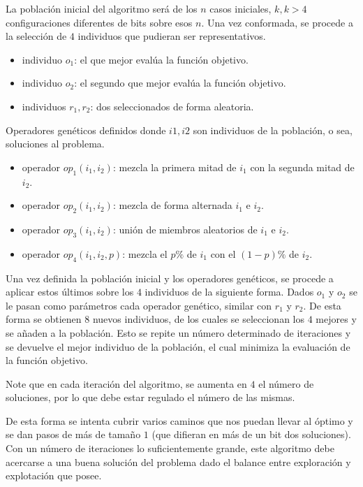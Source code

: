 \documentclass[a4paper,12pt]{book}
\begin{document}
		La población inicial del algoritmo será de los $n$ casos iniciales, $k, k > 4$ configuraciones diferentes de bits sobre esos $n$. Una vez conformada, se procede a la selección de $4$ individuos que pudieran ser representativos.
		
		\begin{itemize}
			\item individuo $o_1$: el que mejor evalúa la función objetivo.
			\item individuo $o_2$: el segundo que mejor evalúa la función objetivo.
			\item individuos $r_1, r_2$: dos seleccionados de forma aleatoria.
		\end{itemize} 
	
		Operadores genéticos definidos donde $i1, i2$ son individuos de la población, o sea, soluciones al problema.
			\begin{itemize}
			\item operador $op_1(i_1, i_2)$: mezcla la primera mitad de $i_1$ con la segunda mitad de $i_2$.
			\item operador $op_2(i_1, i_2)$: mezcla de forma alternada $i_1$ e $i_2$.
			\item operador $op_3(i_1, i_2)$: unión de miembros aleatorios de $i_1$ e $i_2$.
			\item operador $op_4(i_1, i_2, p)$: mezcla el $p\%$ de $i_1$ con el $(1-p)\%$ de $i_2$.
		\end{itemize}
	
		Una vez definida la población inicial y los operadores genéticos, se procede a aplicar estos últimos sobre los $4$ individuos de la siguiente forma. Dados $o_1$ y $o_2$ se le pasan como parámetros cada operador genético, similar con $r_1$ y $r_2$. De esta forma se obtienen $8$ nuevos individuos, de los cuales se seleccionan los $4$ mejores y se añaden a la población. Esto se repite un número determinado de iteraciones y se devuelve el mejor individuo de la población, el cual minimiza la evaluación de la función objetivo.
		
		Note que en cada iteración del algoritmo, se aumenta en $4$ el número de soluciones, por lo que debe estar regulado el número de las mismas.
	
		De esta forma se intenta cubrir varios caminos que nos puedan llevar al óptimo y se dan pasos de más de tamaño $1$ (que difieran en más de un bit dos soluciones). Con un número de iteraciones lo suficientemente grande, este algoritmo debe acercarse a una buena solución del problema dado el balance entre exploración y explotación que posee.
		
\end{document}
